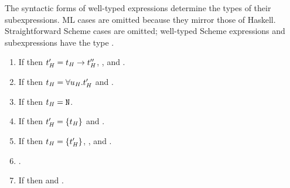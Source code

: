 \begin{lemma}

\label{leminv}

The syntactic forms of well-typed expressions determine the types of their subexpressions.  ML cases are omitted because they mirror those of Haskell.  Straightforward Scheme cases are omitted; well-typed Scheme expressions and subexpressions have the type \tytst.

\begin{enumerate}



\item If \judeh{\env}{\expfabss{\varvarh}{\first{\vartyh}}{\varexph}}{\second{\vartyh}} then $t_{\mathit{H}}' = t_{\mathit{H}} \rightarrow t_{\mathit{H}}''$, \judth{\env}{\first{\vartyh}}, and \judeh{\envexte{\varvarh}{\first{\vartyh}}}{\varexph}{\third{\vartyh}}.


\item If \judeh{\env}{\exptabs{\tyvarh}{\varexph}}{\first{\vartyh}} then $t_{\mathit{H}} = \forall u_{\mathit{H}} . t_{\mathit{H}}'$ and \judeh{\envextt{\tyvarh}}{\varexph}{\second{\vartyh}}.


\item If \judeh{}{\expnum{\symnum}}{\vartyh} then $t_{\mathit{H}} = \mathtt{N}$.


\item If \judeh{\env}{\expnils{\first{\vartyh}}}{\second{\vartyh}} then $t_{\mathit{H}}' = \lbrace t_{\mathit{H}} \rbrace$ and \judth{\env}{\first{\vartyh}}.


\item If \judeh{\env}{\expcons{\first{\varexph}}{\second{\varexph}}}{\first{\vartyh}} then $t_{\mathit{H}} = \lbrace t_{\mathit{H}}' \rbrace$, \judeh{\env}{\first{\varexph}}{\second{\vartyh}}, and \judeh{\env}{\second{\varexph}}{\tylist{\second{\vartyh}}}.


\item \judeh{\envexte{\varvarh}{\vartyh}}{\varvarh}{\vartyh}.


\item If \judeh{\env}{\expfapp{\first{\varexph}}{\second{\varexph}}}{\first{\vartyh}} then \judeh{\env}{\first{\varexph}}{\tyfun{\second{\vartyh}}{\first{\vartyh}}} and \judeh{\env}{\second{\varexph}}{\second{\vartyh}}.


\end{enumerate}
\end{lemma}
